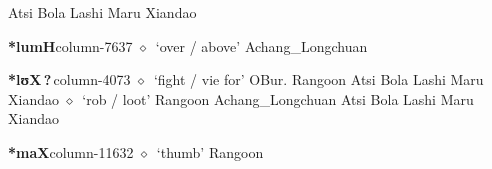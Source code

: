 \hspace{1ex}
         Atsi 
\hspace{1ex}
         Bola 
\hspace{1ex}
         Lashi 
\hspace{1ex}
         Maru 
\hspace{1ex}
         Xiandao 
  \item {\footnotesize \textbf{*lumH}}{\tiny column-7637}
         $\diamond$~`over / above'
         Achang\_Longchuan 
  \item {\footnotesize \textbf{*lʊX\,?\,}}{\tiny column-4073}
         $\diamond$~`fight / vie for'
         OBur. 
\hspace{1ex}
         Rangoon 
\hspace{1ex}
         Atsi 
\hspace{1ex}
         Bola 
\hspace{1ex}
         Lashi 
\hspace{1ex}
         Maru 
\hspace{1ex}
         Xiandao 
\hspace{1ex}
         $\diamond$~`rob / loot'
         Rangoon 
\hspace{1ex}
         Achang\_Longchuan 
\hspace{1ex}
         Atsi 
\hspace{1ex}
         Bola 
\hspace{1ex}
         Lashi 
\hspace{1ex}
         Maru 
\hspace{1ex}
         Xiandao 
  \item {\footnotesize \textbf{*maX}}{\tiny column-11632}
         $\diamond$~`thumb'
         Rangoon 
